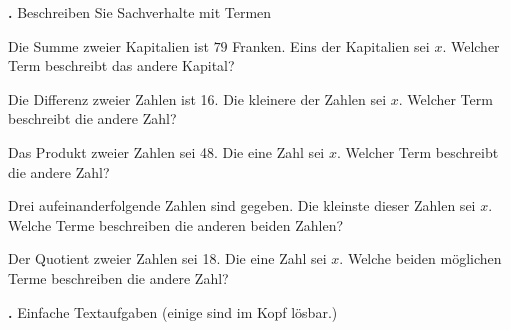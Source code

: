 \newpage

\textbf{\bbwAufgabenNummer{}.}
Beschreiben Sie Sachverhalte mit Termen


\begin{bbwAufgabenBlock}
\item Die Summe zweier Kapitalien ist $79$ Franken. Eins der
Kapitalien sei $x$. Welcher Term
beschreibt das andere Kapital?


\item Die Differenz zweier Zahlen ist 16. Die kleinere der Zahlen sei
$x$. Welcher Term beschreibt die andere Zahl?



\item Das Produkt zweier Zahlen sei 48. Die eine Zahl sei $x$. Welcher
Term beschreibt die andere Zahl?


\item Drei aufeinanderfolgende Zahlen sind gegeben. Die kleinste
dieser Zahlen sei $x$. Welche Terme beschreiben die anderen beiden
Zahlen?


\item Der Quotient zweier Zahlen sei 18. Die eine Zahl sei $x$. Welche
beiden möglichen Terme beschreiben die andere Zahl?


\end{bbwAufgabenBlock}

\newpage

\textbf{\bbwAufgabenNummer{}.}
Einfache Textaufgaben (einige sind im Kopf lösbar.)

